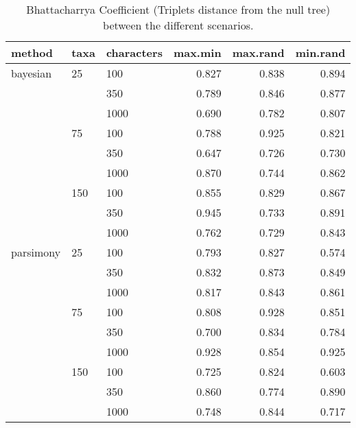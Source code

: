 \begin{table}[ht]
\centering
\begin{tabular}{lllrrr}
  \hline
method & taxa & characters & max.min & max.rand & min.rand \\ 
  \hline
bayesian & 25 & 100 & 0.827 & 0.838 & 0.894 \\ 
   &  & 350 & 0.789 & 0.846 & 0.877 \\ 
   &  & 1000 & 0.690 & 0.782 & 0.807 \\ 
   & 75 & 100 & 0.788 & 0.925 & 0.821 \\ 
   &  & 350 & 0.647 & 0.726 & 0.730 \\ 
   &  & 1000 & 0.870 & 0.744 & 0.862 \\ 
   & 150 & 100 & 0.855 & 0.829 & 0.867 \\ 
   &  & 350 & 0.945 & 0.733 & 0.891 \\ 
   &  & 1000 & 0.762 & 0.729 & 0.843 \\ 
  parsimony & 25 & 100 & 0.793 & 0.827 & 0.574 \\ 
   &  & 350 & 0.832 & 0.873 & 0.849 \\ 
   &  & 1000 & 0.817 & 0.843 & 0.861 \\ 
   & 75 & 100 & 0.808 & 0.928 & 0.851 \\ 
   &  & 350 & 0.700 & 0.834 & 0.784 \\ 
   &  & 1000 & 0.928 & 0.854 & 0.925 \\ 
   & 150 & 100 & 0.725 & 0.824 & 0.603 \\ 
   &  & 350 & 0.860 & 0.774 & 0.890 \\ 
   &  & 1000 & 0.748 & 0.844 & 0.717 \\ 
   \hline
\end{tabular}
\caption{Bhattacharrya Coefficient (Triplets distance from the null tree) between the different scenarios.} 
\label{Full_Tab_BCTrnull}
\end{table}
